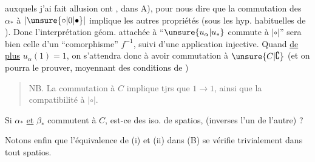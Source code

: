 
auxquels j'ai fait allusion ont , dans A), pour nous dire que la commutation des $\alpha_*$ à $|\unsure{\circ|0|\bullet}|$ implique les autres propriétés (sous les hyp. habituelles de ). Donc l'interprétation géom. attachée à ``$\unsure{u_\alpha|u_*}$ commute à $|\circ|$'' sera bien celle d'un ``comorphisme'' $f^{-1}$, suivi d'une application injective. Quand \uline{de plus} $u_\alpha(1)=1$, on s'attendra donc à avoir commutation à $\unsure{C|\complement}$ (et on pourra le prouver, moyennant des conditions de  )

\begin{quote}
\noindent\vrule\quad\begin{minipage}{0.88\linewidth}
NB. La commutation à $C$ implique tjrs que $1\longrightarrow1$, ainsi que la compatibilité à $|\circ|$.
\end{minipage}
\end{quote}

 Si $\alpha_*$ \uline{et} $\beta_*$ commutent à $C$, est-ce des iso. de spatios,  (inverses l'un de l'autre) ?

Notons enfin que l'équivalence de (i) et (ii) dans (B) se vérifie trivialement dans tout spatios.
